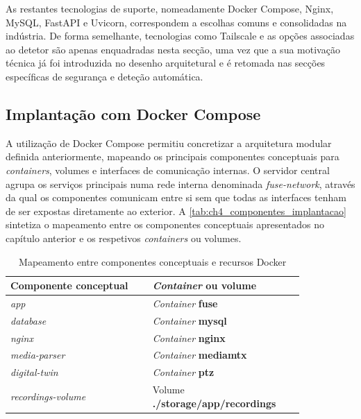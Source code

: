 As restantes tecnologias de suporte, nomeadamente Docker Compose, Nginx, MySQL, FastAPI e Uvicorn, correspondem a escolhas comuns e consolidadas na indústria. De forma semelhante, tecnologias como Tailscale e as opções associadas ao detetor são apenas enquadradas nesta secção, uma vez que a sua motivação técnica já foi introduzida no desenho arquitetural e é retomada nas secções específicas de segurança e deteção automática.

\subsection{Implantação com Docker Compose}

A utilização de Docker Compose permitiu concretizar a arquitetura modular definida anteriormente, mapeando os principais componentes conceptuais para \textit{containers}, volumes e interfaces de comunicação internas. O servidor central agrupa os serviços principais numa rede interna denominada \textit{fuse-network}, através da qual os componentes comunicam entre si sem que todas as interfaces tenham de ser expostas diretamente ao exterior. A \autoref{tab:ch4_componentes_implantacao} sintetiza o mapeamento entre os componentes conceptuais apresentados no capítulo anterior e os respetivos \textit{containers} ou volumes.

\begin{table}[H]
    \centering
    \caption{Mapeamento entre componentes conceptuais e recursos Docker}
    \label{tab:ch4_componentes_implantacao}
    \begin{tabular}{p{0.42\linewidth} p{0.42\linewidth}}
        \toprule
        \textbf{Componente conceptual} & \textbf{\textit{Container} ou volume} \\
        \midrule
        \textit{app} & \textit{Container} \textbf{fuse} \\
        \textit{database} & \textit{Container} \textbf{mysql} \\
        \textit{nginx} & \textit{Container} \textbf{nginx} \\
        \textit{media-parser} & \textit{Container} \textbf{mediamtx} \\
        \textit{digital-twin} & \textit{Container} \textbf{ptz} \\
        \textit{recordings-volume} & Volume \textbf{./storage/app/recordings} \\
        \bottomrule
    \end{tabular}
\end{table}


